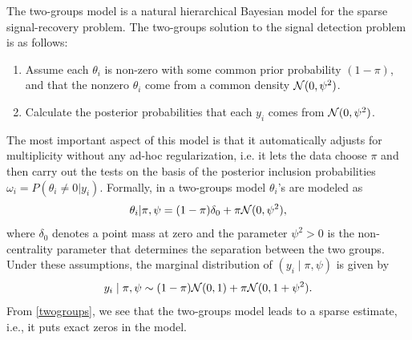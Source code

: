 \documentclass[11pt]{article}
\begin{document}
\begin{appendix}
The two-groups model is a natural hierarchical Bayesian model for the sparse
signal-recovery problem.  The two-groups solution to the signal detection
problem is as follows:
\begin{enumerate}
\item Assume each $\theta_i$ is non-zero with some common prior probability $(1 - \pi)$, and that the nonzero $\theta_i$ come from a common density ${\cal N}(0,\psi^2)$. 
\item Calculate the posterior probabilities that each $y_i$ comes from ${\cal N}(0,\psi^2)$. 
\end{enumerate}
The most important aspect of this model is that it automatically adjusts for multiplicity without any ad-hoc regularization, i.e. it lets the data choose $\pi$ and then carry out the tests on the basis of the posterior inclusion probabilities $\omega_i = P(\theta_i \neq 0 | y_i)$. Formally, in a two-groups model $\theta_i$'s are modeled as
\begin{equation}
\theta_i | \pi, \psi = (1-\pi)\delta_{0} + \pi {\cal N} (0, \psi^2), \label{spikeslab}
\end{equation}
where $\delta_{0}$ denotes a point mass at zero and the parameter $\psi^2>0$ is
the non-centrality parameter that determines the separation between the two
groups. Under these assumptions, the marginal distribution of $(y_i \mid \pi, \psi)$
is given by
\begin{equation}
y_i \mid \pi, \psi \sim  (1-\pi) {\cal N}(0, 1) + \pi {\cal N}(0, 1+\psi^2). \label{twogroups}
\end{equation}
From \eqref{twogroups}, we see that the two-groups model leads to a sparse
estimate, i.e., it puts exact zeros in the model. 
\end{appendix}




\end{document}
